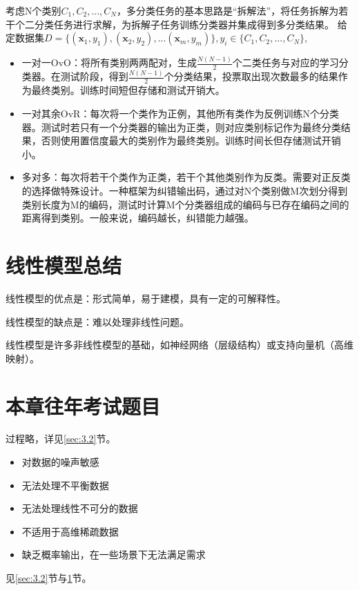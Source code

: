 考虑N个类别$C_1,C_2,...,C_N$，多分类任务的基本思路是“拆解法”，将任务拆解为若干个二分类任务进行求解，为拆解子任务训练分类器并集成得到多分类结果。
给定数据集$
D= \{ (\boldsymbol x_1,y_1),(\boldsymbol x_2,y_2),... (\boldsymbol x_m,y_m) \}, y_i\in\{C_1, C_2,...,C_N \}
$,
\begin{itemize}
    \item 一对一OvO：将所有类别两两配对，生成$\frac{N(N-1)}{2}$个二类任务与对应的学习分类器。在测试阶段，得到$\frac{N(N-1)}{2}$个分类结果，投票取出现次数最多的结果作为最终类别。训练时间短但存储和测试开销大。
    \item 一对其余OvR：每次将一个类作为正例，其他所有类作为反例训练N个分类器。测试时若只有一个分类器的输出为正类，则对应类别标记作为最终分类结果，否则使用置信度最大的类别作为最终类别。训练时间长但存储测试开销小。
    \item 多对多：每次将若干个类作为正类，若干个其他类别作为反类。需要对正反类的选择做特殊设计。一种框架为纠错输出码，通过对N个类别做M次划分得到类别长度为M的编码，测试时计算M个分类器组成的编码与已存在编码之间的距离得到类别。一般来说，编码越长，纠错能力越强。
\end{itemize}

\begin{figure}[!htbp]
	\centering
\end{figure}

\begin{figure}[!htbp]
	\centering
\end{figure}

\section{线性模型总结}\label{sec:3.5}
线性模型的优点是：形式简单，易于建模，具有一定的可解释性。

线性模型的缺点是：难以处理非线性问题。

线性模型是许多非线性模型的基础，如神经网络（层级结构）或支持向量机（高维映射）。

\section{本章往年考试题目}\label{sec:3.6}

过程略，详见\ref{sec:3.2}节。

\begin{itemize}
    \item 对数据的噪声敏感
    \item 无法处理不平衡数据
    \item 无法处理线性不可分的数据
    \item 不适用于高维稀疏数据
    \item 缺乏概率输出，在一些场景下无法满足需求
\end{itemize}

见\ref{sec:3.2}节与\ref{sec:3.5}节。
